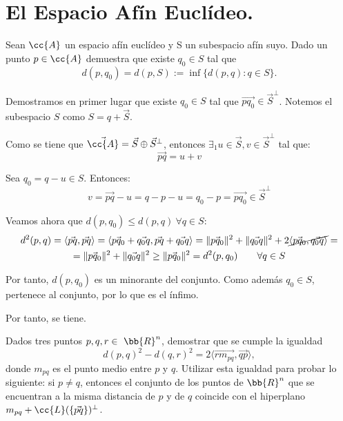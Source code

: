 \section{El Espacio Afín Euclídeo.}\label{Rel:Tema2}

\begin{ejercicio}
    Sean $\cc{A}$ un espacio afín euclídeo y S un subespacio afín suyo. Dado un punto $p \in \cc{A}$ demuestra que existe $q_0 \in S$ tal que
    \begin{equation*}
        d(p, q_0) = d(p, S) := \inf\{d(p, q) : q \in S\}.
    \end{equation*}

    Demostramos en primer lugar que existe $q_0 \in S$ tal que $\vec{pq_0}\in \vec{S}^\perp$.
    Notemos el subespacio $S$ como $S=q+\vec{S}$.
    
    Como se tiene que $\vec{\cc{A}}=\vec{S}\oplus \vec{S}^\perp$, entonces $\exists_1 u\in \vec{S}, v\in \vec{S}^\perp$ tal que:
    \begin{equation*}
        \vec{pq} = u+v
    \end{equation*}

    Sea $q_0=q-u\in S$. Entonces:
    \begin{equation*}
        v = \vec{pq}-u = q-p-u = q_0-p = \vec{pq_0} \in \vec{S}^\perp
    \end{equation*}

    Veamos ahora que $d(p,q_0)\leq d(p,q)~ \forall q\in S$:
    \begin{multline*}
        d^2(p,q) = \langle\vec{pq}, \vec{pq}\rangle
        = \langle\vec{pq_0} + \vec{q_0q}, \vec{pq}+ \vec{q_0q}\rangle
        = \|\vec{pq_0}\|^2 + \|\vec{q_0q}\|^2 + 2\cancel{\langle\vec{pq_0}, \vec{q_0q}\rangle} =\\= \|\vec{pq_0}\|^2 + \|\vec{q_0q}\|^2 \geq \|\vec{pq_0}\|^2 = d^2(p,q_0) \qquad \forall q\in S
    \end{multline*}

    Por tanto, $d(p,q_0)$ es un minorante del conjunto. Como además $q_0\in S$, pertenece al conjunto, por lo que es el ínfimo.

    Por tanto, se tiene.
\end{ejercicio}

\begin{ejercicio} Dados tres puntos $p, q, r \in~\bb{R}^n$, demostrar que se cumple la igualdad
    \begin{equation*}
        d(p,q)^2 - d(q,r)^2 = 2\langle\vec{rm_{pq}}, \vec{qp}\rangle,
    \end{equation*}
    donde $m_{pq}$ es el punto medio entre $p$ y $q$. Utilizar esta igualdad para probar lo siguiente: si $p \neq q$, entonces el conjunto de los puntos de $\bb{R}^n$ que se encuentran a la misma distancia de $p$ y de $q$ coincide con el hiperplano $m_{pq} + \cc{L}(\{\vec{p q}\})^\perp$.
\end{ejercicio}

